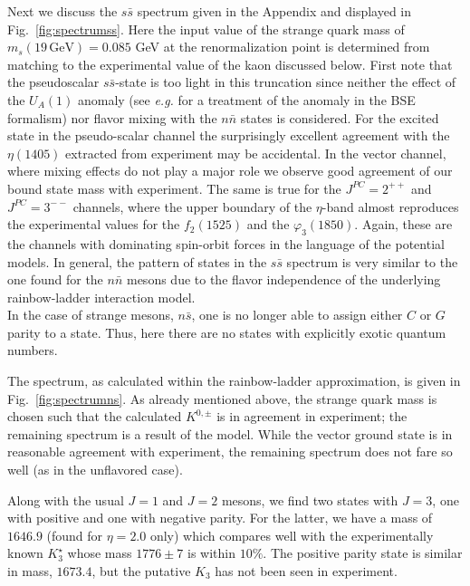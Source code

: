 Next we discuss the $s\bar{s}$ spectrum given in the Appendix and displayed in Fig.~\ref{fig:spectrumss}.
Here the input value of the strange quark mass of $m_s(19 \,\mbox{GeV}) = 0.085$ GeV at the renormalization
point is determined from matching to the experimental value of the kaon discussed below.
First note that the pseudoscalar $s\bar{s}$-state is too light in this truncation since neither the 
effect of the $U_A(1)$ anomaly (see {\it e.g.} \cite{Alkofer:2008et} for a treatment of the anomaly
in the BSE formalism) nor flavor mixing with the $n\bar{n}$ states is considered. For the excited 
state in the pseudo-scalar channel the surprisingly excellent agreement with the $\eta(1405)$ extracted from
experiment may be accidental. In the vector channel, where mixing effects do not play a major role we
observe good agreement of our bound state mass with experiment. The same is true for the $J^{PC}=2^{++}$
and $J^{PC}=3^{--}$ channels, where the upper boundary of the $\eta$-band almost reproduces the
experimental values for the $f_2(1525)$ and the $\varphi_3(1850)$. Again, these are the channels
with dominating spin-orbit forces in the language of the potential models. In general, the pattern of
states in the $s\bar{s}$ spectrum is very similar to the one found for the $n\bar{n}$ mesons due
to the flavor independence of the underlying rainbow-ladder interaction model. \\

In the case of strange mesons, $n\bar{s}$, one is no longer able to assign either $C$ or $G$ 
parity to a state. Thus, here there are no states with explicitly exotic quantum numbers.

The spectrum, as calculated within the rainbow-ladder approximation, is given in Fig.~\ref{fig:spectrumns}. 
As already mentioned above, the strange quark mass is chosen such that the calculated $K^{0,\pm}$ 
is in agreement in experiment; the remaining spectrum is a result of the model.
While the vector ground state is in reasonable agreement with experiment, the remaining spectrum 
does not fare so well (as in the unflavored case).

Along with the usual $J=1$ and $J=2$ mesons, we find two states with $J=3$, one with positive 
and one with negative parity. For the latter, we have a mass of $1646.9$ (found for $\eta=2.0$ only) 
which compares well with the experimentally known $K_3^\star$ whose mass $1776\pm7$ is within $10\%$. 
The positive parity state is similar in mass, $1673.4$, but the putative $K_3$ has not been seen in 
experiment. 


